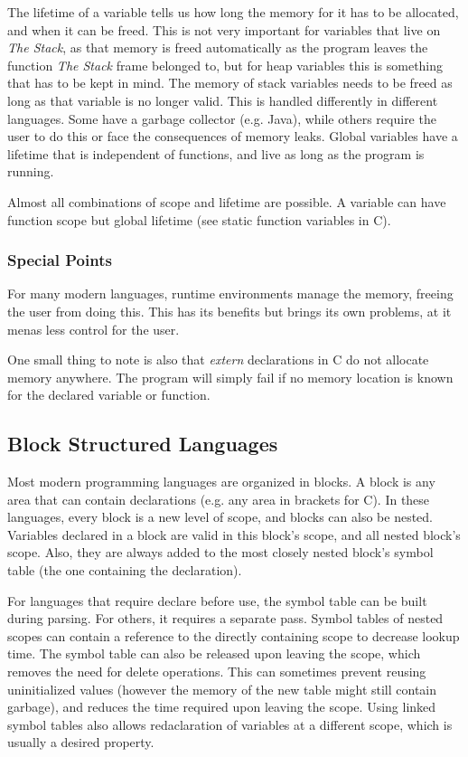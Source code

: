 \documentclass{article}
\begin{document}
The lifetime of a variable tells us how long the memory for it has to be allocated, and when it can be freed.
This is not very important for variables that live on \emph{The Stack}, as that memory is freed automatically as the program leaves the function \emph{The Stack} frame belonged to, but for heap variables this is something that has to be kept in mind.
The memory of stack variables needs to be freed as long as that variable is no longer valid.
This is handled differently in different languages.
Some have a garbage collector (e.g. Java), while others require the user to do this or face the consequences of memory leaks.
Global variables have a lifetime that is independent of functions, and live as long as the program is running.
\begin{keypointbox}
	Almost all combinations of scope and lifetime are possible.
	A variable can have function scope but global lifetime (see static function variables in C).
\end{keypointbox}

\subsubsection{Special Points}
For many modern languages, runtime environments manage the memory, freeing the user from doing this.
This has its benefits but brings its own problems, at it menas less control for the user.

One small thing to note is also that \emph{extern} declarations in C do not allocate memory anywhere.
The program will simply fail if no memory location is known for the declared variable or function.

\subsection{Block Structured Languages}
Most modern programming languages are organized in blocks.
A block is any area that can contain declarations (e.g. any area in brackets for C).
In these languages, every block is a new level of scope, and blocks can also be nested.
Variables declared in a block are valid in this block's scope, and all nested block's scope.
Also, they are always added to the most closely nested block's symbol table (the one containing the declaration).

For languages that require declare before use, the symbol table can be built during parsing.
For others, it requires a separate pass.
Symbol tables of nested scopes can contain a reference to the directly containing scope to decrease lookup time.
The symbol table can also be released upon leaving the scope, which removes the need for delete operations.
This can sometimes prevent reusing uninitialized values (however the memory of the new table might still contain garbage), and reduces the time required upon leaving the scope.
Using linked symbol tables also allows redaclaration of variables at a different scope, which is usually a desired property.
\end{document}
